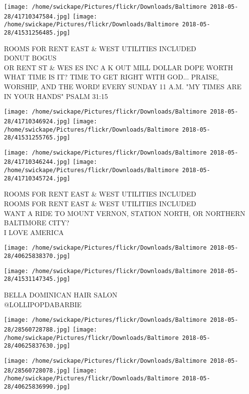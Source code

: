 \documentclass[10pt,letterpaper]{article}
\begin{document}
\texttt{[image: /home/swickape/Pictures/flickr/Downloads/Baltimore 2018-05-28/41710347584.jpg]}
\texttt{[image: /home/swickape/Pictures/flickr/Downloads/Baltimore 2018-05-28/41531256485.jpg]}

ROOMS FOR RENT EAST \& WEST UTILITIES INCLUDED\\
DONUT BOGUS\\
OR RENT ST \& WES ES INC A K OUT MILL DOLLAR DOPE WORTH\\
WHAT TIME IS IT?  TIME TO GET RIGHT WITH GOD... PRAISE, WORSHIP, AND THE WORD!  EVERY SUNDAY 11 A.M.  "MY TIMES ARE IN YOUR HANDS" PSALM 31:15\\
\pagebreak

\texttt{[image: /home/swickape/Pictures/flickr/Downloads/Baltimore 2018-05-28/41710346924.jpg]}
\texttt{[image: /home/swickape/Pictures/flickr/Downloads/Baltimore 2018-05-28/41531255765.jpg]}

\texttt{[image: /home/swickape/Pictures/flickr/Downloads/Baltimore 2018-05-28/41710346244.jpg]}
\texttt{[image: /home/swickape/Pictures/flickr/Downloads/Baltimore 2018-05-28/41710345724.jpg]}

ROOMS FOR RENT EAST \& WEST UTILITIES INCLUDED\\
ROOMS FOR RENT EAST \& WEST UTILITIES INCLUDED\\
WANT A RIDE TO MOUNT VERNON, STATION NORTH, OR NORTHERN BALTIMORE CITY?\\
I LOVE AMERICA\\
\pagebreak

\texttt{[image: /home/swickape/Pictures/flickr/Downloads/Baltimore 2018-05-28/40625838370.jpg]}

\vspace{0.25in}
\texttt{[image: /home/swickape/Pictures/flickr/Downloads/Baltimore 2018-05-28/41531147345.jpg]}

BELLA DOMINICAN HAIR SALON\\
@LOLLIPOPDABARBIE\\
\pagebreak

\texttt{[image: /home/swickape/Pictures/flickr/Downloads/Baltimore 2018-05-28/28560728788.jpg]}
\texttt{[image: /home/swickape/Pictures/flickr/Downloads/Baltimore 2018-05-28/40625837630.jpg]}

\texttt{[image: /home/swickape/Pictures/flickr/Downloads/Baltimore 2018-05-28/28560728078.jpg]}
\texttt{[image: /home/swickape/Pictures/flickr/Downloads/Baltimore 2018-05-28/40625836990.jpg]}
\end{document}

